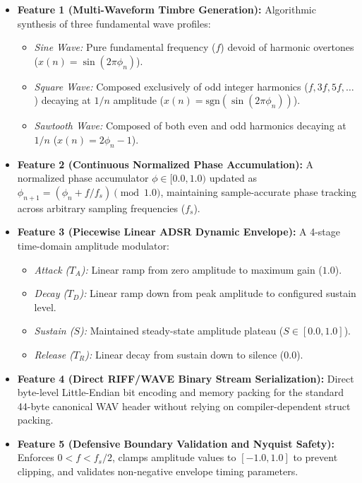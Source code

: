 \documentclass[12pt,a4paper,oneside]{book}
\begin{document}
\begin{itemize}
    \item \textbf{Feature 1 (Multi-Waveform Timbre Generation):} Algorithmic synthesis of three fundamental wave profiles:
    \begin{itemize}
        \item \textit{Sine Wave:} Pure fundamental frequency ($f$) devoid of harmonic overtones ($x(n) = \sin(2\pi \phi_n)$).
        \item \textit{Square Wave:} Composed exclusively of odd integer harmonics ($f, 3f, 5f, \dots$) decaying at $1/n$ amplitude ($x(n) = \text{sgn}(\sin(2\pi \phi_n))$).
        \item \textit{Sawtooth Wave:} Composed of both even and odd harmonics decaying at $1/n$ ($x(n) = 2\phi_n - 1$).
    \end{itemize}

    \item \textbf{Feature 2 (Continuous Normalized Phase Accumulation):} A normalized phase accumulator $\phi \in [0.0, 1.0)$ updated as $\phi_{n+1} = (\phi_n + f / f_s) \pmod{1.0}$, maintaining sample-accurate phase tracking across arbitrary sampling frequencies ($f_s$).

    \item \textbf{Feature 3 (Piecewise Linear ADSR Dynamic Envelope):} A 4-stage time-domain amplitude modulator:
    \begin{itemize}
        \item \textit{Attack ($T_A$):} Linear ramp from zero amplitude to maximum gain ($1.0$).
        \item \textit{Decay ($T_D$):} Linear ramp down from peak amplitude to configured sustain level.
        \item \textit{Sustain ($S$):} Maintained steady-state amplitude plateau ($S \in [0.0, 1.0]$).
        \item \textit{Release ($T_R$):} Linear decay from sustain down to silence ($0.0$).
    \end{itemize}

    \item \textbf{Feature 4 (Direct RIFF/WAVE Binary Stream Serialization):} Direct byte-level Little-Endian bit encoding and memory packing for the standard 44-byte canonical WAV header without relying on compiler-dependent struct packing.

    \item \textbf{Feature 5 (Defensive Boundary Validation and Nyquist Safety):} Enforces $0 < f < f_s / 2$, clamps amplitude values to $[-1.0, 1.0]$ to prevent clipping, and validates non-negative envelope timing parameters.


\end{itemize}
\end{document}
